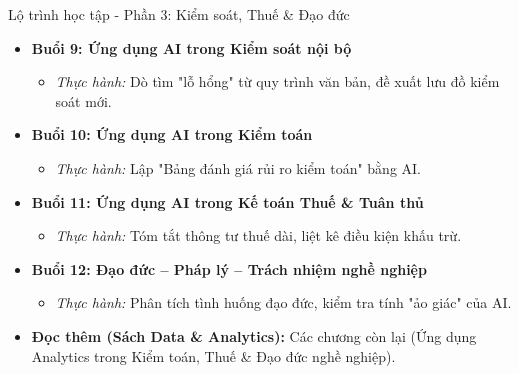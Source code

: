 \documentclass[aspectratio=169]{beamer}
\begin{document}
\begin{frame}{Lộ trình học tập - Phần 3: Kiểm soát, Thuế \& Đạo đức}
    \begin{itemize}
        \item \textbf{Buổi 9: Ứng dụng AI trong Kiểm soát nội bộ}
        \begin{itemize}
            \item \textit{Thực hành:} Dò tìm "lỗ hổng" từ quy trình văn bản, đề xuất lưu đồ kiểm soát mới.
        \end{itemize}
        \item \textbf{Buổi 10: Ứng dụng AI trong Kiểm toán}
        \begin{itemize}
            \item \textit{Thực hành:} Lập "Bảng đánh giá rủi ro kiểm toán" bằng AI.
        \end{itemize}
        \item \textbf{Buổi 11: Ứng dụng AI trong Kế toán Thuế \& Tuân thủ}
        \begin{itemize}
            \item \textit{Thực hành:} Tóm tắt thông tư thuế dài, liệt kê điều kiện khấu trừ.
        \end{itemize}
        \item \textbf{Buổi 12: Đạo đức – Pháp lý – Trách nhiệm nghề nghiệp}
        \begin{itemize}
            \item \textit{Thực hành:} Phân tích tình huống đạo đức, kiểm tra tính "ảo giác" của AI.
        \end{itemize}
        \vspace{0.3cm}
        \item \textbf{Đọc thêm (Sách Data \& Analytics):} Các chương còn lại (Ứng dụng Analytics trong Kiểm toán, Thuế \& Đạo đức nghề nghiệp).
    \end{itemize}
\end{frame}
\end{document}
